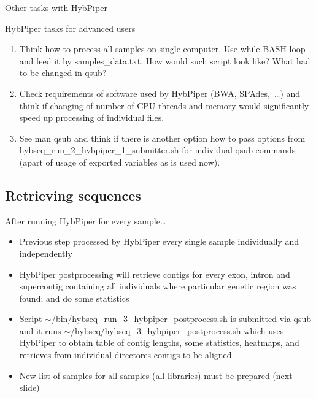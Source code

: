 \documentclass[compress, ucs, xelatex, 11pt, xcolor=x11names, aspectratio=1609,
	hyperref={
		bookmarks=true,
		unicode=true,
		colorlinks=true,
		pdftitle={HybSeq course},
		plainpages=false,
		pdfauthor={Vojtech Zeisek},
		pdfsubject={Practical processing of HybSeq target enrichment sequencing data on computing grids like MetaCentrum},
		pdfcreator={XeLaTeX},
		pdfkeywords={BASH, command line, GNU, HybSeq, Linux, MetaCentrum, sequencing shell, target enrichment},
		linkcolor=Cyan2, %
		anchorcolor=Firebrick2, %
		citecolor=Firebrick2, %
		filecolor=Firebrick2, %
		menucolor=Firebrick2, %
		urlcolor=Chartreuse2, %
		pdftex},
	url={hyphens, lowtilde} %
	]{beamer}
\renewcommand{\texttt}[1]{\colorbox{Snow4}{{\ttfamily #1}}}
\begin{document}
\begin{frame}{Other tasks with HybPiper}
	\begin{exampleblock}{HybPiper tasks for advanced users}
		\begin{enumerate}
			\item Think how to process all samples on single computer. Use \texttt{while} BASH loop and feed it by \texttt{samples\_data.txt}. How would such script look like? What had to be changed in \texttt{qsub}?
			\item Check requirements of software used by HybPiper (BWA, SPAdes,~\ldots) and think if changing of number of CPU threads and memory would significantly speed up processing of individual files.
			\item See \texttt{man qsub} and think if there is another option how to pass options from \texttt{hybseq\_run\_2\_hybpiper\_1\_submitter.sh} for individual \texttt{qsub} commands (apart of usage of exported variables as is used now).
		\end{enumerate}
	\end{exampleblock}
\end{frame}

\subsection{Retrieving sequences}

\begin{frame}{After running HybPiper for every sample\ldots}
	\begin{itemize}
		\item Previous step processed by HybPiper every single sample individually and independently
		\item HybPiper postprocessing will retrieve contigs for every exon, intron and supercontig containing all individuals where particular genetic region was found; and do some statistics
		\item Script \texttt{$\sim$/bin/hybseq\_run\_3\_hybpiper\_postprocess.sh} is submitted via \texttt{qsub} and it runs \texttt{$\sim$/hybseq/hybseq\_3\_hybpiper\_postprocess.sh} which uses HybPiper to obtain table of contig lengths, some statistics, heatmaps, and retrieves from individual directores contigs to be aligned
		\item New list of samples for all samples (all libraries) must be prepared (next slide)
	\end{itemize}
\end{frame}
\end{document}

